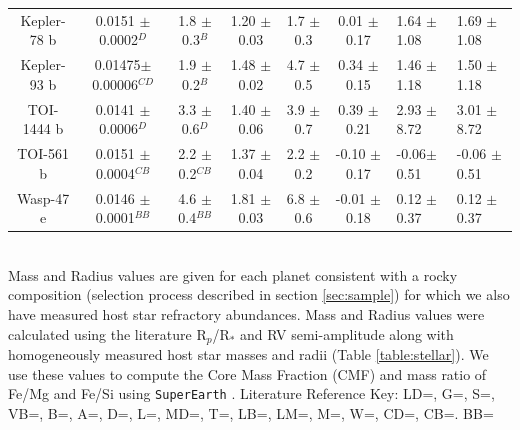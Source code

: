 \documentclass[twocolumn]{aastex631}
\begin{document}
\begin{table}
\begin{centering}
\begin{tabular}{|c|c|c|c|c|c|h|h|}
Kepler-78 b  & 0.0151 $\pm$ 0.0002$^{D}$ & 1.8 $\pm$ 0.3$^{B}$   & 1.20  $\pm$ 0.03 & 1.7  $\pm$ 0.3    &  0.01  $\pm$ 0.17 & 1.64 $\pm$ 1.08 & 1.69 $\pm$ 1.08  \\ 
Kepler-93 b  &0.01475$\pm$0.00006$^{CD}$ & 1.9 $\pm$ 0.2$^{B}$   & 1.48 $\pm$ 0.02  & 4.7  $\pm$ 0.5    &  0.34  $\pm$ 0.15 & 1.46 $\pm$ 1.18 & 1.50 $\pm$ 1.18  \\ 
TOI-1444 b   & 0.0141 $\pm$ 0.0006$^{D}$ & 3.3 $\pm$ 0.6$^{D}$   & 1.40 $\pm$ 0.06  & 3.9  $\pm$ 0.7    &  0.39  $\pm$ 0.21  & 2.93 $\pm$ 8.72 & 3.01 $\pm$ 8.72 \\ 
TOI-561 b    & 0.0151 $\pm$ 0.0004$^{CB}$& 2.2 $\pm$ 0.2$^{CB}$  & 1.37  $\pm$ 0.04 & 2.2   $\pm$ 0.2   &  -0.10  $\pm$ 0.17 & -0.06$\pm$ 0.51 & -0.06 $\pm$ 0.51 \\ 
Wasp-47 e    & 0.0146 $\pm$ 0.0001$^{BB}$& 4.6 $\pm$ 0.4$^{BB}$  & 1.81 $\pm$ 0.03  & 6.8  $\pm$ 0.6    &  -0.01  $\pm$ 0.18 & 0.12 $\pm$ 0.37 & 0.12 $\pm$ 0.37 \\ \hline

\end{tabular}
      \small 
      \\
       Mass and Radius values are given for each planet consistent with a rocky composition (selection process described in section \ref{sec:sample}) for which we also have measured host star refractory abundances. Mass and Radius values were calculated using the literature R$_{p}$/R$_{*}$ and RV semi-amplitude along with homogeneously measured host star masses and radii (Table \ref{table:stellar}). We use these values to compute the Core Mass Fraction (CMF) and mass ratio of Fe/Mg and Fe/Si using {\tt SuperEarth} \citep{2006Icar..181..545V, Plotnykov2020}. Literature Reference Key: LD=\cite{2021NatAs...5..775D}, G=\cite{2019ApJ...876L..24G}, S=\cite{2021AJ....161..117S}, VB=\cite{2022A&A...668A..31B}, B=\cite{2023A&A...677A..33B}, A=\cite{2021PSJ.....2..152A}, D=\cite{2019ApJ...883...79D}, L=\cite{2018A&A...620A..77L}, MD=\cite{2019A&A...624A..38D}, T=\cite{2020A&A...641A..92T}, LB=\cite{2016AJ....152..160B}, LM=\cite{2016AJ....152..204L}, M=\cite{2016ApJ...822...86M}, W=\cite{2024ApJS..270....8W}, CD=\cite{2015ApJ...800..135D}, CB=\cite{Brinkman2023B}. BB=\cite{2022AJ....163..197B}
\label{table:planetparams}
\end{centering}



\end{table}
\end{document}
